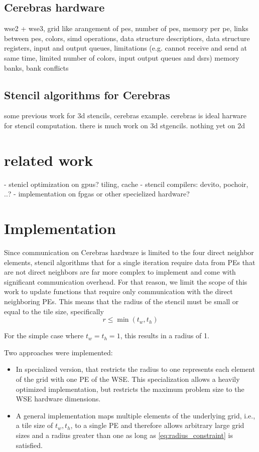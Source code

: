 \documentclass{article}
\begin{document}
\subsection{Cerebras hardware}
wse2 + wse3, grid like arangement of pes, number of pes, memory per pe, links between pes, colors, simd operations, data structure descriptiors, data structure registers, input and output queues, limitations (e.g. cannot receive and send at same time, limited number of colors, input output queues and dsrs)
memory banks, bank conflicts
\subsection{Stencil algorithms for Cerebras}
some previous work for 3d stencils, cerebras example.
cerebras is ideal harware for stencil computation. 
there is much work on 3d stgencils. nothing yet on 2d
\section{related work}
- stenicl optimization on gpus? tiling, cache
- stencil compilers: devito, pochoir, ..?
- implementation on fpgas or other specielized hardware?



\section{Implementation}
Since communication on Cerebras hardware is limited to the four direct neighbor elements, stencil algorithms that for a single iteration require data from PEs that are not direct neighbors are far more complex to implement and come with significant communication overhead. For that reason, we limit the scope of this work to update functions that require only communication with the direct neighboring PEs. This means that the radius of the stencil must be small or equal to the tile size, specifically
\begin{equation}    
\label{eq:radius_constraint}
r \leq \min(t_w, t_h)
\end{equation}

For the simple case where $t_w=t_h=1$, this results in a radius of 1.

Two approaches were implemented:
\begin{itemize}
    \item In specialized version, that restricts the radius to one represents each element of the grid with one PE of the WSE. This specialization allows a heavily optimized implementation, but restricts the maximum problem size to the WSE hardware dimensions.
    \item A general implementation maps multiple elements of the underlying grid, i.e., a tile size of $t_w, t_h$, to a single PE and therefore allows arbitrary large grid sizes and a radius greater than one as long as \ref{eq:radius_constraint} is satisfied. 
\end{itemize}
\end{document}
